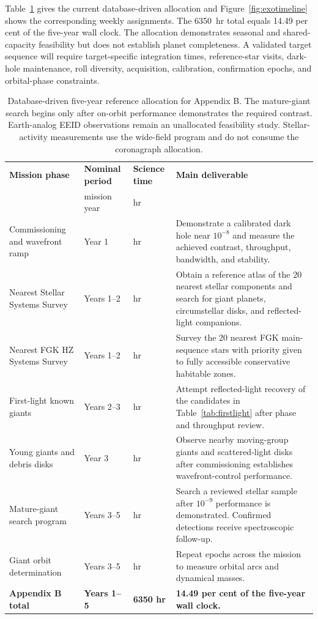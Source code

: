 Table~\ref{tab:exotimeline} gives the current database-driven allocation and
Figure~\ref{fig:exotimeline} shows the corresponding weekly assignments. The
6350~hr total equals 14.49 per cent of the five-year wall clock. The allocation
demonstrates seasonal and shared-capacity feasibility but does not establish
planet completeness. A validated target sequence will require target-specific
integration times, reference-star visits, dark-hole maintenance, roll
diversity, acquisition, calibration, confirmation epochs, and orbital-phase
constraints.

\begin{table}[tp]
\centering
\sffamily\small
\begin{tabularx}{\textwidth}{@{}
  >{\raggedright\arraybackslash}p{3.5cm}
  >{\raggedright\arraybackslash}p{2.15cm}
  >{\raggedright\arraybackslash}p{2.4cm}
  >{\raggedright\arraybackslash}X@{}}
\toprule
\textbf{Mission phase} & \textbf{Nominal period} & \textbf{Science time} & \textbf{Main deliverable}\\
 & mission year & hr & \\
\midrule
Commissioning and wavefront ramp & Year 1 & 400 hr & Demonstrate a calibrated dark hole near $10^{-8}$ and measure the achieved contrast, throughput, bandwidth, and stability.\\
Nearest Stellar Systems Survey & Years 1--2 & 400 hr & Obtain a reference atlas of the 20 nearest stellar components and search for giant planets, circumstellar disks, and reflected-light companions.\\
Nearest FGK HZ Systems Survey & Years 1--2 & 2000 hr & Survey the 20 nearest FGK main-sequence stars with priority given to fully accessible conservative habitable zones.\\
First-light known giants & Years 2--3 & 400 hr & Attempt reflected-light recovery of the candidates in Table~\ref{tab:firstlight} after phase and throughput review.\\
Young giants and debris disks & Year 3 & 350 hr & Observe nearby moving-group giants and scattered-light disks after commissioning establishes wavefront-control performance.\\
Mature-giant search program & Years 3--5 & 2000 hr & Search a reviewed stellar sample after $10^{-9}$ performance is demonstrated. Confirmed detections receive spectroscopic follow-up.\\
Giant orbit determination & Years 3--5 & 800 hr & Repeat epochs across the mission to measure orbital arcs and dynamical masses.\\
\midrule
\textbf{Appendix B total} & \textbf{Years 1--5} & \textbf{6350 hr} & \textbf{14.49 per cent of the five-year wall clock.}\\
\bottomrule
\end{tabularx}
\caption{Database-driven five-year reference allocation for Appendix B. The
mature-giant search begins only after on-orbit performance demonstrates the
required contrast. Earth-analog EEID observations remain an unallocated
feasibility study. Stellar-activity measurements use the wide-field program
and do not consume the coronagraph allocation.}
\label{tab:exotimeline}
\end{table}

